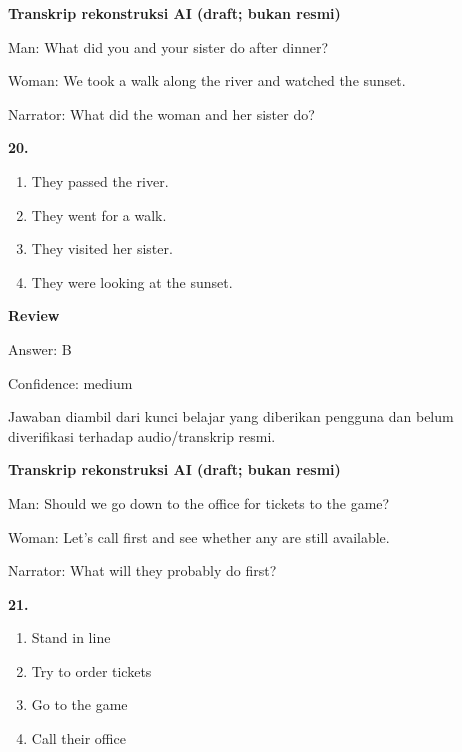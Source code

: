 \documentclass[12pt]{article}
\begin{document}
\endgroup
\par
\vspace{0.25\baselineskip}
\begin{exampleblock}
\textbf{Transkrip rekonstruksi AI (draft; bukan resmi)}\par
Man: What did you and your sister do after dinner?\par
Woman: We took a walk along the river and watched the sunset.\par
Narrator: What did the woman and her sister do?\par
\end{exampleblock}
\noindent\textbf{20.}
\begin{enumerate}[label=(\Alph*),leftmargin=*,itemsep=0.2em]
\item They passed the river.
\item They went for a walk.
\item They visited her sister.
\item They were looking at the sunset.
\end{enumerate}
\par
\begingroup
\setlength{\parskip}{0pt}
\setlength{\parindent}{0pt}
\textbf{Review}\par
Answer: B\par
Confidence: medium\par
Jawaban diambil dari kunci belajar yang diberikan pengguna dan belum diverifikasi terhadap audio/transkrip resmi.\par
\endgroup
\par
\vspace{0.25\baselineskip}
\begin{exampleblock}
\textbf{Transkrip rekonstruksi AI (draft; bukan resmi)}\par
Man: Should we go down to the office for tickets to the game?\par
Woman: Let's call first and see whether any are still available.\par
Narrator: What will they probably do first?\par
\end{exampleblock}
\noindent\textbf{21.}
\begin{enumerate}[label=(\Alph*),leftmargin=*,itemsep=0.2em]
\item Stand in line
\item Try to order tickets
\item Go to the game
\item Call their office
\end{enumerate}
\end{document}
